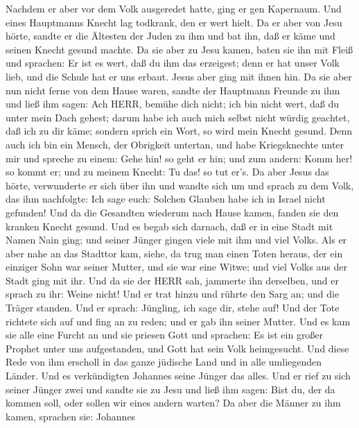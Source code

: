  Nachdem er aber vor dem Volk ausgeredet hatte, ging er gen
Kapernaum.  Und eines Hauptmanns Knecht lag todkrank, den er
wert hielt.  Da er aber von Jesu hörte, sandte er die
Ältesten der Juden zu ihm und bat ihn, daß er käme und seinen Knecht
gesund machte.  Da sie aber zu Jesu kamen, baten sie ihn mit
Fleiß und sprachen: Er ist es wert, daß du ihm das erzeigest;
 denn er hat unser Volk lieb, und die Schule hat er uns
erbaut.  Jesus aber ging mit ihnen hin. Da sie aber nun
nicht ferne von dem Hause waren, sandte der Hauptmann Freunde zu ihm und
ließ ihm sagen: Ach HERR, bemühe dich nicht; ich bin nicht wert, daß du
unter mein Dach gehest;  darum habe ich auch mich selbst
nicht würdig geachtet, daß ich zu dir käme; sondern sprich ein Wort, so
wird mein Knecht gesund.  Denn auch ich bin ein Mensch, der
Obrigkeit untertan, und habe Kriegsknechte unter mir und spreche zu
einem: Gehe hin! so geht er hin; und zum andern: Komm her! so kommt er;
und zu meinem Knecht: Tu das! so tut er's.  Da aber Jesus
das hörte, verwunderte er sich über ihn und wandte sich um und sprach zu
dem Volk, das ihm nachfolgte: Ich sage euch: Solchen Glauben habe ich in
Israel nicht gefunden!  Und da die Gesandten wiederum nach
Hause kamen, fanden sie den kranken Knecht gesund.  Und es
begab sich darnach, daß er in eine Stadt mit Namen Nain ging; und seiner
Jünger gingen viele mit ihm und viel Volks.  Als er aber
nahe an das Stadttor kam, siehe, da trug man einen Toten heraus, der ein
einziger Sohn war seiner Mutter, und sie war eine Witwe; und viel Volks
aus der Stadt ging mit ihr.  Und da sie der HERR sah,
jammerte ihn derselben, und er sprach zu ihr: Weine nicht! 
Und er trat hinzu und rührte den Sarg an; und die Träger standen. Und er
sprach: Jüngling, ich sage dir, stehe auf!  Und der Tote
richtete sich auf und fing an zu reden; und er gab ihn seiner Mutter.
 Und es kam sie alle eine Furcht an und sie priesen Gott
und sprachen: Es ist ein großer Prophet unter uns aufgestanden, und Gott
hat sein Volk heimgesucht.  Und diese Rede von ihm erscholl
in das ganze jüdische Land und in alle umliegenden Länder. 
Und es verkündigten Johannes seine Jünger das alles. Und er rief zu sich
seiner Jünger zwei  und sandte sie zu Jesu und ließ ihm
sagen: Bist du, der da kommen soll, oder sollen wir eines andern warten?
 Da aber die Männer zu ihm kamen, sprachen sie: Johannes
